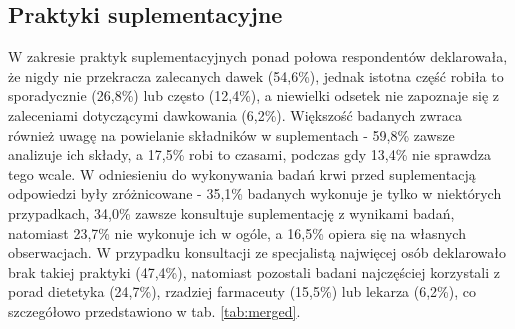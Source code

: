 




\subsection{Praktyki suplementacyjne}

W zakresie praktyk suplementacyjnych ponad połowa respondentów deklarowała, że nigdy nie przekracza zalecanych dawek (54,6\%), jednak istotna część robiła to sporadycznie (26,8\%) lub często (12,4\%), a niewielki odsetek nie zapoznaje się z zaleceniami dotyczącymi dawkowania (6,2\%). Większość badanych zwraca również uwagę na powielanie składników w suplementach - 59,8\% zawsze analizuje ich składy, a 17,5\% robi to czasami, podczas gdy 13,4\% nie sprawdza tego wcale. W odniesieniu do wykonywania badań krwi przed suplementacją odpowiedzi były zróżnicowane - 35,1\% badanych wykonuje je tylko w niektórych przypadkach, 34,0\% zawsze konsultuje suplementację z wynikami badań, natomiast 23,7\% nie wykonuje ich w ogóle, a 16,5\% opiera się na własnych obserwacjach. W przypadku konsultacji ze specjalistą najwięcej osób deklarowało brak takiej praktyki (47,4\%), natomiast pozostali badani najczęściej korzystali z porad dietetyka (24,7\%), rzadziej farmaceuty (15,5\%) lub lekarza (6,2\%), co szczegółowo przedstawiono w tab. \ref{tab:merged}.

